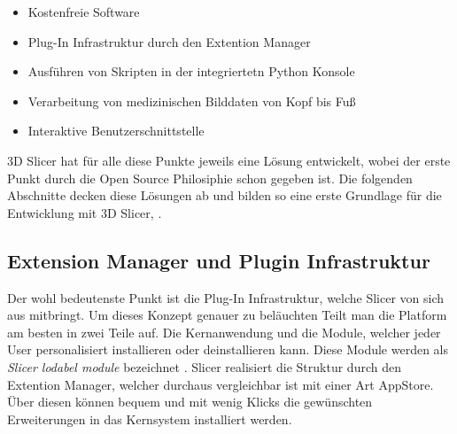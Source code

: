\begin{itemize}
	\item Kostenfreie Software

	\item Plug-In Infrastruktur durch den Extention Manager

	\item Ausführen von Skripten in der integriertetn Python Konsole

	\item Verarbeitung von medizinischen Bilddaten von Kopf bis Fuß

	\item Interaktive Benutzerschnittstelle
\end{itemize}

3D Slicer hat für alle diese Punkte jeweils eine Lösung entwickelt, wobei der
erste Punkt durch die Open Source Philosiphie schon gegeben ist. Die folgenden Abschnitte
decken diese Lösungen ab und bilden so eine erste Grundlage für die Entwicklung mit
3D Slicer\citep[vgl.][]{slicer2024}, \citep[vgl.][]{fedorov2012slicer}.

\subsection{Extension Manager und Plugin Infrastruktur}
Der wohl bedeutenste Punkt ist die Plug-In Infrastruktur, welche Slicer von sich
aus mitbringt. Um dieses Konzept genauer zu beläuchten Teilt man die Platform am
besten in zwei Teile auf. Die Kernanwendung und die Module, welcher jeder User personalisiert
installieren oder deinstallieren kann. Diese Module werden als \textit{Slicer
lodabel module} bezeichnet \citep[vgl.][Seite 1332]{fedorov2012slicer}. Slicer
realisiert die Struktur durch den Extention Manager, welcher durchaus vergleichbar
ist mit einer Art AppStore. Über diesen können bequem und mit wenig Klicks die
gewünschten Erweiterungen in das Kernsystem installiert werden.

